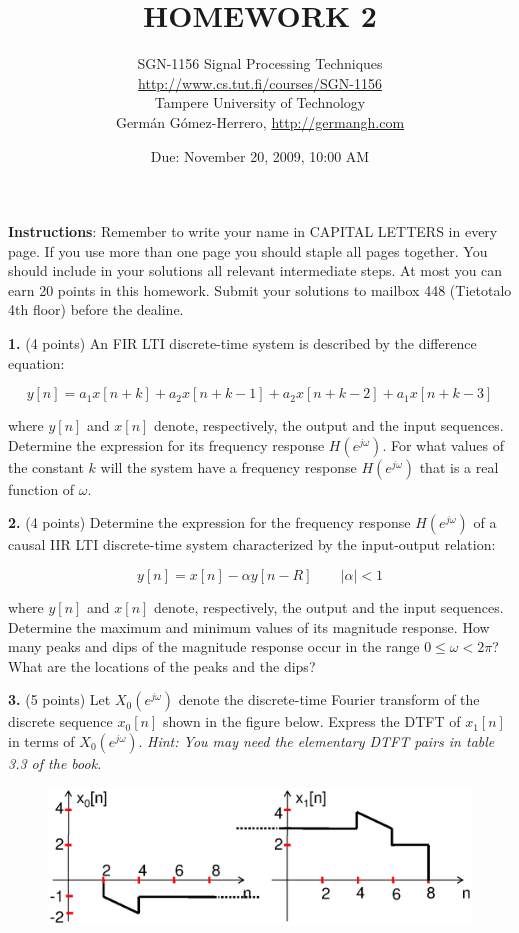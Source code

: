 \documentclass[a4paper,11pt,oneside]{article}
\title{\large{\textbf{HOMEWORK 2}}}
\author{SGN-1156 Signal Processing Techniques\\
\url{http://www.cs.tut.fi/courses/SGN-1156}\\
Tampere University of Technology\\
Germ\'an G\'omez-Herrero, \url{http://germangh.com}}
\date{Due: November 20, 2009, 10:00 AM}
\begin{document}
\maketitle

\noindent \textbf{Instructions}: Remember to write your name in CAPITAL LETTERS in every page. If you use more than one page you should staple all pages together. You should include in your solutions all relevant intermediate steps. At most you can earn 20 points in this homework. Submit your solutions to mailbox 448 (Tietotalo 4th floor) before the dealine.
\vspace{2cm} 

\noindent \textbf{1.} (4 points) An FIR LTI discrete-time system is described by the difference equation:

\[
y[n]=a_1x[n+k]+a_2x[n+k-1]+a_2x[n+k-2]+a_1x[n+k-3]
\]

where $y[n]$ and $x[n]$ denote, respectively, the output and the input sequences. Determine the expression for its frequency response $H(e^{j\omega})$. For what values of the constant $k$ will the system have a frequency response $H(e^{j\omega})$ that is a real function of $\omega$.

\vspace{1cm} 

\noindent \textbf{2.} (4 points) Determine the expression for the frequency response $H(e^{j\omega})$ of a causal IIR LTI discrete-time system characterized by the input-output relation:

\[
y[n] = x[n]-\alpha y[n-R] \qquad |\alpha|<1
\]

where $y[n]$ and $x[n]$ denote, respectively, the output and the input sequences. Determine the maximum and minimum values of its magnitude response. How many peaks and dips of the magnitude response occur in the range $0\leq \omega < 2\pi$? What are the locations of the peaks and the dips?


\vspace{1cm}

\noindent \textbf{3.} (5 points) Let $X_0(e^{j\omega})$ denote the discrete-time Fourier transform of the discrete sequence $x_0[n]$ shown in the figure below. Express the DTFT of $x_1[n]$ in terms of $X_0(e^{j\omega})$. \emph{Hint: You may need the elementary DTFT pairs in table 3.3 of the book.}


\begin{figure}[h!]
\centering
\includegraphics[width=.9\textwidth]{fig1.eps}
\end{figure}
\end{document}

